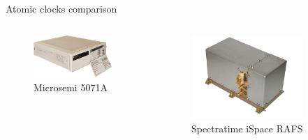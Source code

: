 \begin{frame}{Atomic clocks comparison}
\begin{columns}[c, onlytextwidth]
        \begin{column}{0.25\textwidth}

            \begin{figure}[H]
                \centering
                \includegraphics[width=0.9\textwidth]{img/Microsemi-5071A.png}
                \caption{Microsemi 5071A}
            \end{figure}

        \end{column}

        \begin{column}{0.25\textwidth}

            \begin{figure}[H]
                \centering
                \includegraphics[width=0.9\textwidth]{img/Spectratime-iSpace-RAFS.png}
                \caption{Spectratime iSpace RAFS}
            \end{figure}

        \end{column}

        \begin{column}{0.25\textwidth}


\end{column}
\end{columns}
\end{frame}
